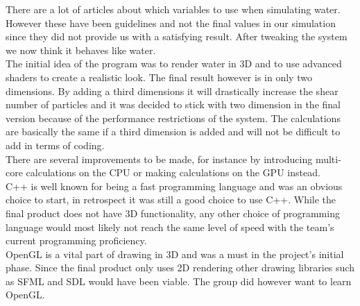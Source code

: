 \documentclass[a4paper,12pt,twoside,final]{report}
\begin{document}
\noindent There are a lot of articles about which variables to use when simulating water. However these have been guidelines and not the final values in our simulation since they did not provide us with a satisfying result. After tweaking the system we now think it behaves like water. \\

\noindent The initial idea of the program was to render water in 3D and to use advanced shaders to create a realistic look. The final result however is in only two dimensions. By adding a third dimensions it will drastically increase the shear number of particles and it was decided to stick with two dimension in the final version because of the performance restrictions of the system. The calculations are basically the same if a third dimension is added and will not be difficult to add in terms of coding. \\

\noindent There are several improvements to be made, for instance by introducing multi-core calculations on the CPU or making calculations on the GPU instead. \\

\noindent C++ is well known for being a fast programming language and was an obvious choice to start, in retrospect it was still a good choice to use C++. While the final product does not have 3D functionality, any other choice of programming language would most likely not reach the same level of speed with the team’s current programming proficiency. \\

\noindent OpenGL is a vital part of drawing in 3D and was a must in the project’s initial phase. Since the final product only uses 2D rendering other drawing libraries such as SFML and SDL would have been viable. The group did however want to learn OpenGL.








\end{document}
